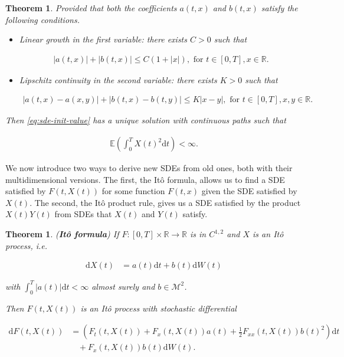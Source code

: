 \documentclass[a4paper]{article}
\newtheorem{theorem}[definition]{Theorem}
\begin{document}
\begin{theorem}\label{thm:sde-solution}
  Provided that both the coefficients $a(t,x)$ and $b(t,x)$ satisfy the following conditions.

  \begin{itemize}
    \item Linear growth in the first variable: there exists $C > 0$ such that

      \begin{align*}
        |a(t,x)| + |b(t,x)| \le C (1 + |x|), \text{ for } t \in [0,T], x \in \mathbb{R}.
      \end{align*}

    \item Lipschitz continuity in the second variable: there exists $K > 0$ such that

      \begin{align*}
        |a(t,x) - a(x,y)| + |b(t,x) - b(t,y)| \le K |x-y|, \text{ for } t \in [0,T], x,y \in \mathbb{R}.
      \end{align*}
  \end{itemize}

  Then \eqref{eq:sde-init-value} has a unique solution with continuous paths such that

  \begin{align*}
    \mathbb{E}\left(\int_0^T X(t)^2 \mathrm{d}t\right) < \infty.
  \end{align*}
\end{theorem}

We now introduce two ways to derive new SDEs from old ones, both with their multidimensional versions. The first, the It\^o formula, allows us to find a SDE satisfied by $F(t,X(t))$ for some function $F(t,x)$ given the SDE satisfied by $X(t)$. The second, the It\^o product rule, gives us a SDE satisfied by the product $X(t)Y(t)$ from SDEs that $X(t)$ and $Y(t)$ satisfy.

\begin{theorem}\label{thm:ito-formula}
  (\textbf{It\^o formula}) If $F : [0,T] \times \mathbb{R} \to \mathbb{R}$ is in $C^{1,2}$ and $X$ is an It\^o process, i.e.

  \begin{align*}
    \mathrm{d}X(t) &= a(t) \mathrm{d}t + b(t) \mathrm{d}W(t)
  \end{align*}

  with $\int_0^T |a(t)| \mathrm{d}t < \infty$ almost surely and $b \in \mathcal{M}^2$.

  Then $F(t,X(t))$ is an It\^o process with stochastic differential

  \begin{align*}
    \mathrm{d}F(t,X(t)) &= \left(F_t(t,X(t)) + F_x(t,X(t)) a(t) + \frac{1}{2} F_{xx}(t,X(t)) b(t)^2 \right) \mathrm{d}t\\
    &\ \ \ \ + F_x(t,X(t)) b(t) \mathrm{d}W(t).
  \end{align*}
\end{theorem}
\end{document}

